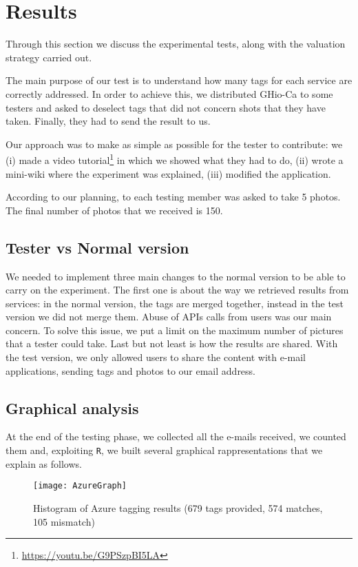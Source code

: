 \section{Results}
\label{sec:results}

Through this section we discuss the experimental tests, along with the valuation 
strategy carried out. 

The main purpose of our test is to understand how many tags for each service are 
correctly addressed. In order to achieve this, we distributed GHio-Ca to some 
testers and asked to deselect tags that did not concern shots that they have 
taken. Finally, they had to send the result to us.

Our approach was to make as simple as possible for the tester to contribute: we 
(i) made a video tutorial\footnote{\url{https://youtu.be/G9PSzpBI5LA}} in which 
we showed what they had to do, (ii) wrote a mini-wiki where the experiment was 
explained, (iii) modified the application. 

According to our planning, to each testing member was asked to take 5 photos. 
The final number of photos that we received is 150.

\subsection{Tester vs Normal version}

We needed to implement three main changes to the normal version to be able to 
carry on the experiment. The first one is about the way we retrieved results 
from services: in the normal version, the tags are merged together, instead in 
the test version we did not merge them.
Abuse of APIs calls from users was our main concern. To solve this issue, we put 
a limit on the maximum number of pictures that a tester could take.
Last but not least is how the results are shared. With the test version, we only 
allowed users to share the content with e-mail applications, sending tags and 
photos to our email address.


\subsection{Graphical analysis}

At the end of the testing phase, we collected all the e-mails received, we 
counted them and, exploiting \texttt{R}, we built several graphical 
rappresentations that we explain as follows.

\begin{figure}[H]
\centering
\texttt{[image: AzureGraph]}
\caption{Histogram of Azure tagging results (679 tags provided, 574 matches, 105 
mismatch)}
\label{img:testgraphsazure}
\end{figure}

